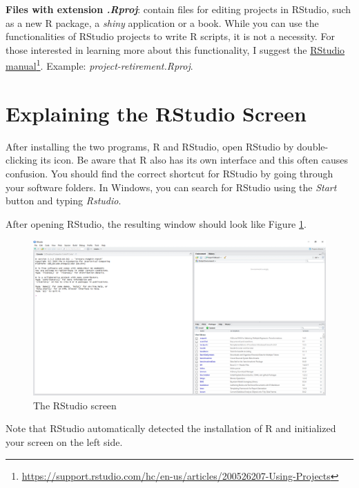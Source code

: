 \documentclass[
  12pt,
]{book}
\begin{document}
\textbf{Files with extension \emph{.Rproj}}: contain files for editing projects in RStudio, such as a new R package, a \emph{shiny} application or a book. While you can use the functionalities of RStudio projects to write R scripts, it is not a necessity. For those interested in learning more about this functionality, I suggest the \href{https://support.rstudio.com/hc/en-us/articles/200526207-Using-Projects}{RStudio manual}\footnote{\url{https://support.rstudio.com/hc/en-us/articles/200526207-Using-Projects}}. Example: \emph{project-retirement.Rproj}. 

\hypertarget{explaining-the-rstudio-screen}{%
\section{Explaining the RStudio Screen}\label{explaining-the-rstudio-screen}}

After installing the two programs, R and RStudio, open RStudio by double-clicking its icon. Be aware that R also has its own interface and this often causes confusion. You should find the correct shortcut for RStudio by going through your software folders. In Windows, you can search for RStudio using the \emph{Start} button and typing \emph{Rstudio}. 

After opening RStudio, the resulting window should look like Figure \ref{fig:RStudio1}.

\begin{figure}[!htbp]

{\centering \includegraphics[width=1\linewidth]{figs/RStudio1} 

}

\caption{The RStudio screen}\label{fig:RStudio1}
\end{figure}

Note that RStudio automatically detected the installation of R and initialized your screen on the left side.
\end{document}
